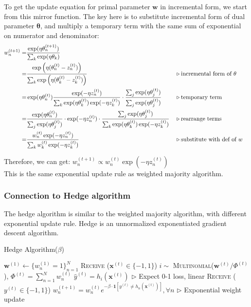 \documentclass[11pt]{article}
\begin{document}
To get the update equation for primal parameter $\boldsymbol{w}$ in incremental form, we start from this mirror function.
The key here is to substitute incremental form of dual parameter $\boldsymbol{\theta}$, and multiply a temporary term with the same sum of exponential on numerator and denominator:
\begin{align}
w_n^{(t+1)} = & \frac{\exp (\eta \theta_n^{(t+1)})}{\sum_k\exp(\eta\theta_k)} \nonumber \\
= & \frac{\exp \left(\eta (\theta_n^{(t)} - z_n^{(t)})\right) }{\sum_{k} \exp \left( \eta (\theta_k^{(t)} - z_k^{(t)}) \right)} \nonumber \hfill && \triangleright \text{incremental form of } \theta \\
= & \exp (\eta {\theta}_n^{(t)}) \frac{\exp (-\eta {z}_n^{(t)})}{\sum_k \exp (\eta {\theta}_k^{(t)}) \exp (-\eta {z}_k^{(t)})} \cdot \frac{\sum_j \exp (\eta {\theta}_j^{(t)})}{\sum_j \exp (\eta {\theta}_j^{(t)})} \nonumber && \triangleright \text{temporary term} \\
= & \frac{\exp (\eta {\theta}_n^{(t)})}{\sum_j \exp (\eta {\theta}_j^{(t)})} \cdot \exp (-\eta {z}_n^{(t)}) \cdot \frac{\sum_j \exp (\eta {\theta}_j^{(t)})}{\sum_k \exp (\eta {\theta}_k^{(t)}) \exp (-\eta {z}_k^{(t)})} \nonumber && \triangleright \text{rearrange terms} \\
= & \frac{{w}_n^{(t)} \exp (-\eta z_n^{(t)})}{\sum_k {w}_k^{(t)} \exp (- \eta z_k^{(t)})} \nonumber && \triangleright \text{substitute with def of }w
\end{align}

Therefore, we can get: $ w_n^{(t+1)} \propto w_n^{(t)} \exp (-\eta z_n^{(t)})$ \\
This is the same exponential update rule as weighted majority algorithm. %

\subsubsection{Connection to Hedge algorithm}
The hedge algorithm is similar to the weighted majority algorithm, with different exponential update rule. Hedge is an unnormalized exponentiated gradient descent algorithm.
\begin{algorithm}[H]
\caption{Hedge Algorithm($\beta$)}
\begin{algorithmic}[1]
\STATE $\boldsymbol{w}^{(1)} \leftarrow \{w_n^{(1)}=1\}_{n=1}^N$
\STATE \textsc{Receive} ($\boldsymbol{x}^{(t)}\in\{-1, 1\}$)
\STATE $i\sim$ \textsc{Multinomial}($\boldsymbol{w}^{(t)}/\Phi^{(t)}$), $\Phi^{(t)}=\sum_{n=1}^Nw_n^{(t)}$
\STATE $\hat{y}^{(t)}=h_i(\boldsymbol{x}^{(t)})$ \hfill $\triangleright$ Expect 0-1 loss, linear
\STATE \textsc{Receive} ($y^{(t)}\in\{-1, 1\}$)
\STATE $w_n^{(t+1)} =  w_n^{(t)}e^{-\beta\cdot\boldsymbol{1}[y^{(t)}\neq h_n(\boldsymbol{x}^{(t)})]}, \forall n$ \hfill $\triangleright$ Exponential weight update
\ENDFOR
\end{algorithmic}
\end{algorithm}
\end{document}
